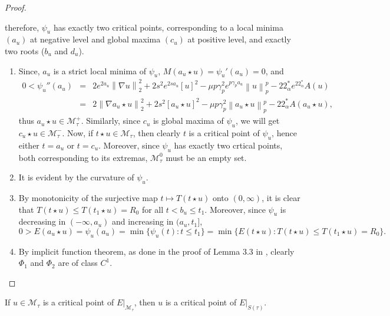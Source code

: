 \documentclass[11pt]{article}
\numberwithin{equation}{section}
\numberwithin{mytheorem}{section}
\begin{document}
\begin{proof}
\begin{center}
			\end{center}
			therefore, $\psi_u$ has exactly two critical points, corresponding to a local minima $(a_u)$ at negative level and global maxima $(c_u)$ at positive level, and exactly two roots ($b_u$ and $d_u$).
			\begin{enumerate}
				\item  Since, $a_u$ is a strict local minima of $\psi_{u}$, 
				$M(a_u\star u) = \psi_{u}'(a_u)=0$,  and 
				\begin{eqnarray*}
					0  < \psi_{u}''(a_u)& = & 2e^{2a_u}\left\| \nabla u \right\|_2^2+2s^2e^{2sa_u}[u]^2-\mu p\gamma_p^2e^{p\gamma_pa_u}\left\| u \right\|_p^p-22^*_{\alpha}e^{22^*_{\alpha}}A(u)\\
					& = & 2\left\| \nabla a_u\star u \right\|_2^2+2s^2[a_u \star u]^2-\mu p\gamma_p^2\left\| a_u\star u \right\|_p^p-22^*_{\alpha}A(a_u\star u),
				\end{eqnarray*}		 	 	
				thus $a_u \star u \in \mathcal{M}_{\tau}^+$. Similarly, since $c_u$ is global maxima of $\psi_u$, we will get $c_u\star u \in \mathcal{M}_{\tau}^-$. 
				Now, if $t\star u \in \mathcal{M}_{\tau}$, then clearly $t$ is a critical point of $\psi_u$, hence either $t=a_u$ or $t=c_u$. Moreover, since $\psi_{u}$ has exactly two crtical points, both corresponding to its extremas, $\mathcal{M}_{\tau}^0$ must be an empty set.
				\item It is evident by the curvature of $\psi_{u}$.
				\item By monotonicity of the surjective map $t\mapsto T(t\star u)$ onto $(0,\infty)$, it is clear that $T(t\star u)\leq T(t_1\star u)=R_0$ for all $t<b_u\leq t_1$. Moreover, since $\psi_u$ is decreasing in $(-\infty, a_u)$ and increasing in $(a_u,t_1]$,
				\begin{equation*}
					0>E(a_u\star u)= \psi_u(a_u)  =  \min\{\psi_u(t): t\leq t_1\} = \min\{E(t\star u): T(t\star u)\leq T(t_1\star u)=R_0\}.
				\end{equation*}
				\item By implicit function theorem, as done in the proof of Lemma 3.3 in \cite{Han2022Normalized}, clearly $\Phi_1$ and $\Phi_2$ are of class $C^1$.
			\end{enumerate}
		\end{proof}
		\begin{lemma}\label{Lemma 4.3}
			If $u\in \mathcal{M}_{\tau}$ is a critical point of $E|_{\mathcal{M}_{\tau}}$, then $u$ is a critical point of $E|_{S(\tau)}$.
		\end{lemma}
\end{document}
